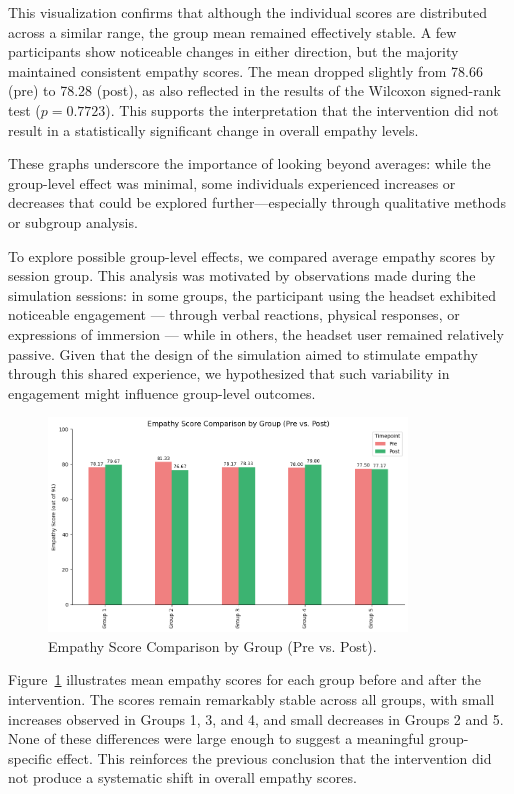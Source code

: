 This visualization confirms that although the individual scores are distributed across a similar range, the group mean remained effectively stable. A few participants show noticeable changes in either direction, but the majority maintained consistent empathy scores. The mean dropped slightly from 78.66 (pre) to 78.28 (post), as also reflected in the results of the Wilcoxon signed-rank test ($p = 0.7723$). This supports the interpretation that the intervention did not result in a statistically significant change in overall empathy levels.

These graphs underscore the importance of looking beyond averages: while the group-level effect was minimal, some individuals experienced increases or decreases that could be explored further—especially through qualitative methods or subgroup analysis.

To explore possible group-level effects, we compared average empathy scores by session group. This analysis was motivated by observations made during the simulation sessions: in some groups, the participant using the headset exhibited noticeable engagement — through verbal reactions, physical responses, or expressions of immersion — while in others, the headset user remained relatively passive. Given that the design of the simulation aimed to stimulate empathy through this shared experience, we hypothesized that such variability in engagement might influence group-level outcomes.


\begin{figure}[htbp]
    \centering
    \includegraphics[width=0.85\textwidth]{../../Figures/emph-scores-comp-grp.png}
    \caption{Empathy Score Comparison by Group (Pre vs. Post).}
    \label{fig:empathy_group_bar}
\end{figure}

Figure~\ref{fig:empathy_group_bar} illustrates mean empathy scores for each group before and after the intervention. The scores remain remarkably stable across all groups, with small increases observed in Groups 1, 3, and 4, and small decreases in Groups 2 and 5. None of these differences were large enough to suggest a meaningful group-specific effect. This reinforces the previous conclusion that the intervention did not produce a systematic shift in overall empathy scores.

